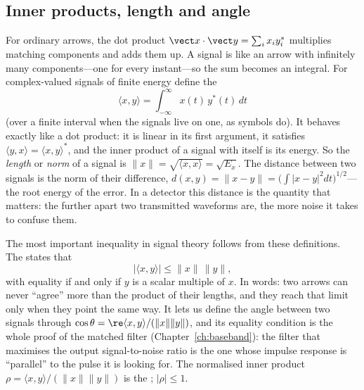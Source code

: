 
\subsection{Inner products, length and angle}

For ordinary arrows, the dot product $\vect x\cdot\vect y=\sum_i x_iy_i^*$ multiplies matching
components and adds them up. A signal is like an arrow with infinitely many components---one for
every instant---so the sum becomes an integral. For complex-valued signals of finite energy define
the 
\begin{equation}
\langle x,y\rangle=\int_{-\infty}^{\infty}x(t)\,y^*(t)\,dt
\label{eq:ch02:inner}
\end{equation}
(over a finite interval when the signals live on one, as symbols do). It behaves exactly like a
dot product: it is linear in its first argument, it satisfies
$\langle y,x\rangle=\langle x,y\rangle^*$, and the inner product of a signal with itself is its
energy. So the \emph{length} or \emph{norm} of a signal is $\|x\|=\sqrt{\langle x,x\rangle}=\sqrt{E_x}$.
The distance between two signals is the norm of their difference,
$d(x,y)=\|x-y\|=\big(\int|x-y|^2dt\big)^{1/2}$---the root energy of the error. In a detector this
distance is the quantity that matters: the further apart two transmitted waveforms are, the more
noise it takes to confuse them.

The most important inequality in signal theory follows from these definitions. The
 states that
\begin{equation}
|\langle x,y\rangle|\le\|x\|\,\|y\|,
\label{eq:ch02:cs}
\end{equation}
with equality if and only if $y$ is a scalar multiple of $x$. In words: two arrows can never
``agree'' more than the product of their lengths, and they reach that limit only when they point the
same way. It lets us define the angle between two signals through
$\cos\theta=\re\langle x,y\rangle/(\|x\|\|y\|)$, and its equality condition is the whole proof of
the matched filter (Chapter~\ref{ch:baseband}): the filter that maximises the output
signal-to-noise ratio is the one whose impulse response is ``parallel'' to the pulse it is looking
for. The normalised inner product $\rho=\langle x,y\rangle/(\|x\|\|y\|)$ is the
; $|\rho|\le1$.

